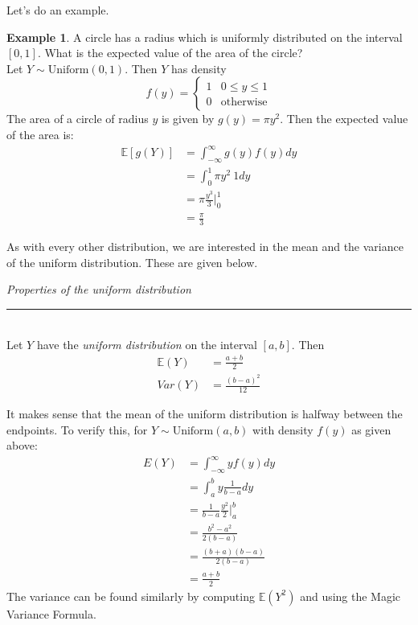 \documentclass[12pt]{article}
\theoremstyle{definition}
\newtheorem*{example}{Example}
\theoremstyle{remark}
\def\E{{\mathbb E}}
\begin{document}
Let's do an example.

\begin{example}A circle has a radius which is uniformly distributed on the interval $[0, 1]$. What is the expected value of the area of the circle?\\

Let $Y\sim\text{Uniform}(0, 1)$. Then $Y$ has density
\[
f(y) = \begin{cases}
1 & 0 \leq y \leq 1 \\
0 & \text{otherwise}
\end{cases}
\]
The area of a circle of radius $y$ is given by $g(y) = \pi y^2$. Then the expected value of the area is:
\begin{align*}
\E[g(Y)] &= \int_{-\infty}^\infty g(y) f(y) dy \\
&= \int_0^1 \pi y^2 \: 1 dy \\
&= \pi \frac{y^3}{3} \Bigr|_0^1 \\
&= \frac{\pi}{3}
\end{align*}

\end{example}

As with every other distribution, we are interested in the mean and the variance of the uniform distribution. These are given below.

\begin{framed}
\emph{Properties of the uniform distribution}\\
  \rule{\dimexpr{}\fboxrule}{.1pt} \\
Let  $Y$ have the \emph{uniform distribution} on the interval $[a, b]$. Then
\begin{align*}
\E(Y) &= \frac{a + b}{2} \\
Var(Y) &= \frac{(b-a)^2}{12}
\end{align*}
\end{framed}
It makes sense that the mean of the uniform distribution is halfway between the endpoints. To verify this, for $Y \sim\text{Uniform}(a, b)$ with density $f(y)$ as given above:
\begin{align*}
E(Y) &= \int_{-\infty}^\infty y f(y) dy \\
&= \int_a^b y \frac{1}{b-a} dy \\
&= \frac{1}{b-a} \frac{y^2}{2} \Bigr|_a^b \\
&= \frac{b^2 - a^2}{2(b-a)} \\
&= \frac{(b+a)(b-a)}{2(b-a)} \\
&= \frac{a+b}{2}
\end{align*}
The variance can be found similarly by computing $\E(Y^2)$ and using the Magic Variance Formula.
\end{document}
